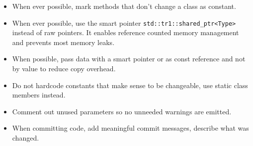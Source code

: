 \begin{itemize}
\item When ever possible, mark methods that don't change a class as constant.
\item When ever possible, use the smart pointer \lstinline{std::tr1::shared_ptr<Type>} instead of raw pointers.
It enables reference counted memory management and prevents most memory leaks.
\item When possible, pass data with a smart pointer or as const reference and not by value to reduce copy overhead.
\item Do not hardcode constants that make sense to be changeable, use static class members instead.
\item Comment out unused parameters so no unneeded warnings are emitted.
\item When committing code, add meaningful commit messages, describe what was changed.
\end{itemize}

